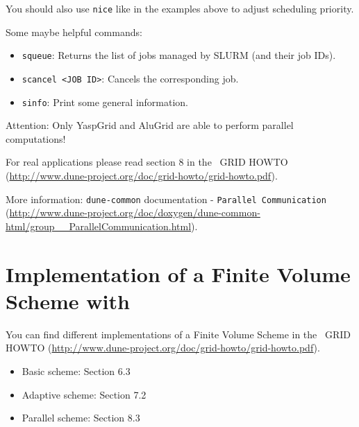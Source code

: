 You should also use \lstinline!nice! like in the examples above to adjust scheduling priority.

Some maybe helpful commands:
\begin{itemize}
 \item \lstinline!squeue!: Returns the list of jobs managed by SLURM (and their job IDs).
 \item \lstinline!scancel <JOB ID>!: Cancels the corresponding job.
 \item \lstinline!sinfo!: Print some general information.
\end{itemize}
\bigskip

Attention: Only YaspGrid and AluGrid are able to perform parallel computations!

For real applications please read section 8 in the \Dune\ GRID HOWTO   (\url{http://www.dune-project.org/doc/grid-howto/grid-howto.pdf}).

More information: \texttt{dune-common} documentation - \texttt{Parallel Communication}  (\url{http://www.dune-project.org/doc/doxygen/dune-common-html/group__ParallelCommunication.html}).


\section{Implementation of a Finite Volume Scheme with \Grid}
You can find different implementations of a Finite Volume Scheme in the \Dune\ GRID HOWTO 
(\url{http://www.dune-project.org/doc/grid-howto/grid-howto.pdf}).

\begin{itemize}
 \item Basic scheme: Section 6.3
 \item Adaptive scheme: Section 7.2
 \item Parallel scheme: Section 8.3
\end{itemize}








